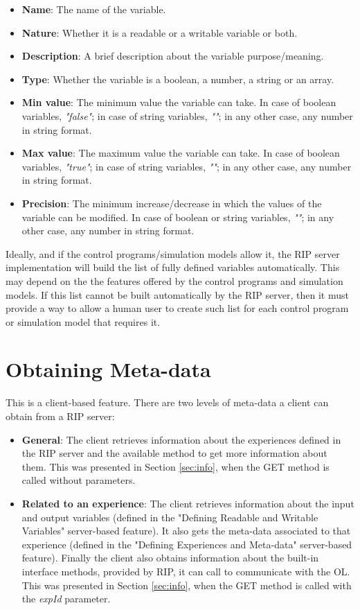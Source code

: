 \begin{itemize}
    \item \textbf{Name}: The name of the variable.
    \item \textbf{Nature}: Whether it is a readable or a writable variable or both.
    \item \textbf{Description}: A brief description about the variable purpose/meaning.
    \item \textbf{Type}: Whether the variable is a boolean, a number, a string or an array.
    \item \textbf{Min value}: The minimum value the variable can take. In case of boolean variables, \textit{"false"}; in case of string variables, \textit{""}; in any other case, any number in string format.
    \item \textbf{Max value}: The maximum value the variable can take. In case of boolean variables, \textit{"true"}; in case of string variables, \textit{""}; in any other case, any number in string format.
    \item \textbf{Precision}: The minimum increase/decrease in which the values of the variable can be modified. In case of boolean or string variables, \textit{""}; in any other case, any number in string format.
\end{itemize}

Ideally, and if the control programs/simulation models allow it, the RIP server implementation will build the list of fully defined variables automatically. This may depend on the the features offered by the control programs and simulation models. If this list cannot be built automatically by the RIP server, then it must provide a way to allow a human user to create such list for each control program or simulation model that requires it.

\section{Obtaining Meta-data}
This is a client-based feature. There are two levels of meta-data a client can obtain from a RIP server:

\begin{itemize}
    \item \textbf{General}: The client retrieves information about the experiences defined in the RIP server and the available method to get more information about them. This was presented in Section \ref{sec:info}, when the GET method is called without parameters.
    \item \textbf{Related to an experience}: The client retrieves information about the input and output variables (defined in the "Defining Readable and Writable Variables" server-based feature). It also gets the meta-data associated to that experience (defined in the "Defining Experiences and Meta-data" server-based feature). Finally the client also obtains information about the built-in interface methods, provided by RIP, it can call to communicate with the OL. This was presented in Section \ref{sec:info}, when the GET method is called with the \textit{expId} parameter.
\end{itemize}

